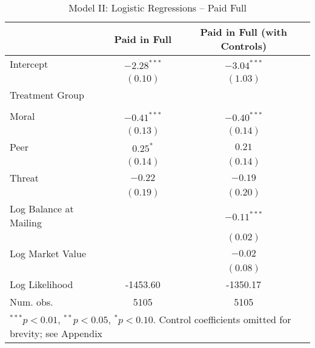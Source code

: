 \documentclass[12pt,titlepage]{article}
\begin{document}
\begin{table}[htbp]
\caption{Model II: Logistic Regressions -- Paid Full} \label{table:modelII}
\begin{center}
\begin{tabular}{l c c }
\hline
                       & Paid in Full & Paid in Full (with Controls) \\
\hline
Intercept              & $-2.28^{***}$ & $-3.04^{***}$  \\
                       & $(0.10)$      & $(1.03)$      \\
Treatment Group        &               &               \\
                       &               &               \\
\quad Moral            & $-0.41^{***}$  & $-0.40^{***}$  \\
                       & $(0.13)$      & $(0.14)$      \\
\quad Peer             & $0.25^{*}$        & $0.21$        \\
                       & $(0.14)$      & $(0.14)$      \\
\quad Threat           & $-0.22$       & $-0.19$       \\
                       & $(0.19)$      & $(0.20)$      \\
Log Balance at Mailing &               & $-0.11^{***}$ \\
                       &               & $(0.02)$      \\
Log Market Value       &               & $-0.02$       \\
                       &               & $(0.08)$      \\
\hline
Log Likelihood         & -1453.60      & -1350.17      \\
Num. obs.              & 5105          & 5105          \\
\hline
\multicolumn{3}{l}{\scriptsize{$^{***}p<0.01$, $^{**}p<0.05$, $^*p<0.10$. Control coefficients omitted for brevity; see Appendix}}
\end{tabular}
\end{center}
\end{table}
\end{document}
